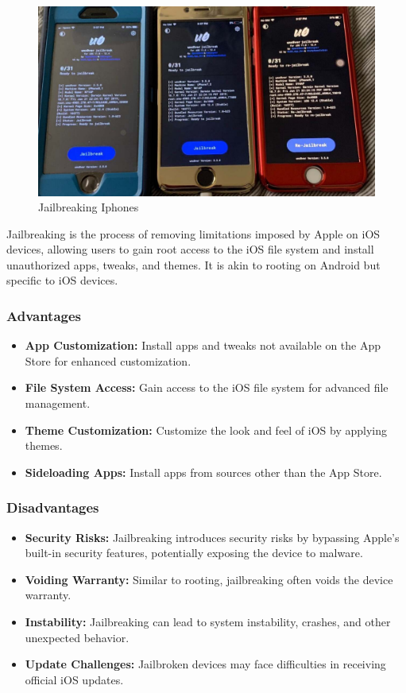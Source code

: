 \documentclass[11pt]{article}
\begin{document}
\begin{figure}[H]
      \centering
      \includegraphics[width=.75\textwidth]{iphone jailbreaking/iphone jailbreaking_6.jpg}
      \caption{Jailbreaking Iphones}
\end{figure}

Jailbreaking is the process of removing limitations imposed by Apple on iOS
devices, allowing users to gain root access to the iOS file system and install
unauthorized apps, tweaks, and themes. It is akin to rooting on Android but
specific to iOS devices.

\subsubsection*{Advantages}
\begin{itemize}
      \item \textbf{App Customization:} Install apps and tweaks not available on the App Store for enhanced customization.
      \item \textbf{File System Access:} Gain access to the iOS file system for advanced file management.
      \item \textbf{Theme Customization:} Customize the look and feel of iOS by applying themes.
      \item \textbf{Sideloading Apps:} Install apps from sources other than the App Store.
\end{itemize}

\subsubsection*{Disadvantages}
\begin{itemize}
      \item \textbf{Security Risks:} Jailbreaking introduces security risks by bypassing Apple's built-in security features, potentially exposing the device to malware.
      \item \textbf{Voiding Warranty:} Similar to rooting, jailbreaking often voids the device warranty.
      \item \textbf{Instability:} Jailbreaking can lead to system instability, crashes, and other unexpected behavior.
      \item \textbf{Update Challenges:} Jailbroken devices may face difficulties in receiving official iOS updates.
\end{itemize}
\end{document}
